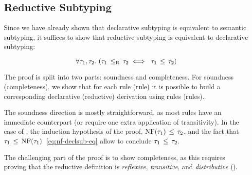 \subsection{Reductive Subtyping}\label{sec:redsub-correct}

Since we have already shown that declarative subtyping is
equivalent to semantic subtyping, it suffices to show that
reductive subtyping is equivalent to declarative subtyping:

\begin{theorem}\label{thm:redsub-correct}
\[
\forall \ty_1, \ty_2.\ (\bjsubr{\ty_1}{\ty_2} \iff\ \bjsub{\ty_1}{\ty_2})
\]
\end{theorem}

The proof is split into two parts: soundness and completeness.
For soundness (completeness), 
we show that for each \RR{}\!rule (\RD{}\!rule) it is possible to build
a corresponding declarative (reductive) derivation 
using \RD{}\!rules (\RR{}\!rules).

The soundness direction is mostly straightforward, as most \RR{}\!rules
have an immediate \RD{}\!counterpart (or require one extra application
of transitivity).
In the case of , the induction hypothesis of the proof,
$\mathop{\mathrm{NF}}(\tau_1) \, \leq \, \tau_2$, 
and the fact that $\tau_1 \, \leq \, \mathop{\mathrm{NF}}(\tau_1)$~\eqref{eq:nf-declsub-eq}
allow to conclude $\tau_1 \, \leq \, \tau_2$.

The challenging part of the proof is to show completeness,
as this requires proving that the reductive definition 
is \emph{reflexive}, \emph{transitive}, and \emph{distributive}
().



